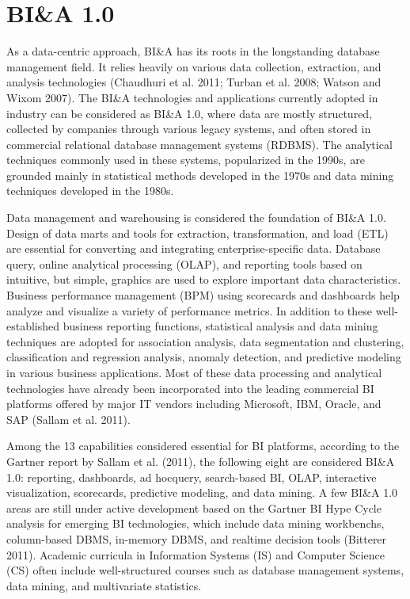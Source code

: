 \section*{BI\&A 1.0}
As a data-centric approach, BI\&A has its roots in the longstanding database management field. It relies heavily on
various data collection, extraction, and analysis technologies
(Chaudhuri et al. 2011; Turban et al. 2008; Watson and
Wixom 2007). The BI\&A technologies and applications
currently adopted in industry can be considered as BI\&A 1.0,
where data are mostly structured, collected by companies
through various legacy systems, and often stored in commercial relational database management systems (RDBMS). The
analytical techniques commonly used in these systems,
popularized in the 1990s, are grounded mainly in statistical
methods developed in the 1970s and data mining techniques
developed in the 1980s. 

Data management and warehousing is considered the foundation of BI\&A 1.0. Design of data marts and tools for
extraction, transformation, and load (ETL) are essential for
converting and integrating enterprise-specific data. Database
query, online analytical processing (OLAP), and reporting
tools based on intuitive, but simple, graphics are used to
explore important data characteristics. Business performance
management (BPM) using scorecards and dashboards help
analyze and visualize a variety of performance metrics. In
addition to these well-established business reporting functions, statistical analysis and data mining techniques are
adopted for association analysis, data segmentation and
clustering, classification and regression analysis, anomaly
detection, and predictive modeling in various business applications. Most of these data processing and analytical technologies have already been incorporated into the leading commercial BI platforms offered by major IT vendors including
Microsoft, IBM, Oracle, and SAP (Sallam et al. 2011).

Among the 13 capabilities considered essential for BI platforms, according to the Gartner report by Sallam et al. (2011),
the following eight are considered BI\&A 1.0: reporting,
dashboards, ad hocquery, search-based BI, OLAP, interactive
visualization, scorecards, predictive modeling, and data
mining. A few BI\&A 1.0 areas are still under active development based on the Gartner BI Hype Cycle analysis for
emerging BI technologies, which include data mining workbenchs, column-based DBMS, in-memory DBMS, and realtime decision tools (Bitterer 2011). Academic curricula in
Information Systems (IS) and Computer Science (CS) often include well-structured courses such as database management
systems, data mining, and multivariate statistics.

